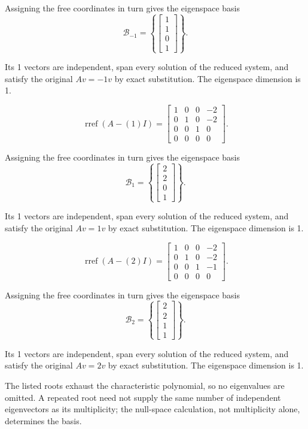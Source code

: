 Assigning the free coordinates in turn gives the eigenspace basis
\[ \mathcal B_{-1}=\left\{\begin{bmatrix}1\\1\\0\\1\end{bmatrix}\right\}.\]

Its 1 vectors are independent, span every solution of the reduced system, and satisfy the original $Av=-1v$ by exact substitution. The eigenspace dimension is 1.

\[ \operatorname{rref}(A-(1)I)=\begin{bmatrix}1 & 0 & 0 & -2\\0 & 1 & 0 & -2\\0 & 0 & 1 & 0\\0 & 0 & 0 & 0\end{bmatrix}.\]

Assigning the free coordinates in turn gives the eigenspace basis
\[ \mathcal B_{1}=\left\{\begin{bmatrix}2\\2\\0\\1\end{bmatrix}\right\}.\]

Its 1 vectors are independent, span every solution of the reduced system, and satisfy the original $Av=1v$ by exact substitution. The eigenspace dimension is 1.

\[ \operatorname{rref}(A-(2)I)=\begin{bmatrix}1 & 0 & 0 & -2\\0 & 1 & 0 & -2\\0 & 0 & 1 & -1\\0 & 0 & 0 & 0\end{bmatrix}.\]

Assigning the free coordinates in turn gives the eigenspace basis
\[ \mathcal B_{2}=\left\{\begin{bmatrix}2\\2\\1\\1\end{bmatrix}\right\}.\]

Its 1 vectors are independent, span every solution of the reduced system, and satisfy the original $Av=2v$ by exact substitution. The eigenspace dimension is 1.

The listed roots exhaust the characteristic polynomial, so no eigenvalues are omitted. A repeated root need not supply the same number of independent eigenvectors as its multiplicity; the null-space calculation, not multiplicity alone, determines the basis.

